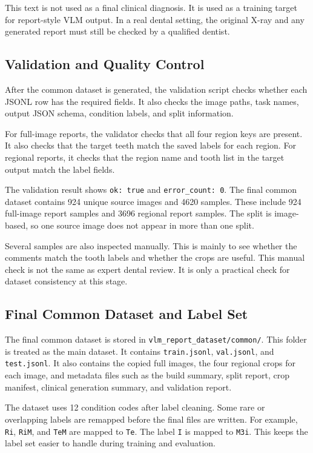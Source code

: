 \documentclass[a4paper,12pt]{report}
\begin{document}
This text is not used as a final clinical diagnosis. It is used as a training target for report-style VLM output. In a real dental setting, the original X-ray and any generated report must still be checked by a qualified dentist.


\subsection{Validation and Quality Control}

After the common dataset is generated, the validation script checks whether each JSONL row has the required fields. It also checks the image paths, task names, output JSON schema, condition labels, and split information.

For full-image reports, the validator checks that all four region keys are present. It also checks that the target teeth match the saved labels for each region. For regional reports, it checks that the region name and tooth list in the target output match the label fields.

The validation result shows \texttt{ok: true} and \texttt{error\_count: 0}. The final common dataset contains 924 unique source images and 4620 samples. These include 924 full-image report samples and 3696 regional report samples. The split is image-based, so one source image does not appear in more than one split.

Several samples are also inspected manually. This is mainly to see whether the comments match the tooth labels and whether the crops are useful. This manual check is not the same as expert dental review. It is only a practical check for dataset consistency at this stage.


\subsection{Final Common Dataset and Label Set}

The final common dataset is stored in \texttt{vlm\_report\_dataset/common/}. This folder is treated as the main dataset. It contains \texttt{train.jsonl}, \texttt{val.jsonl}, and \texttt{test.jsonl}. It also contains the copied full images, the four regional crops for each image, and metadata files such as the build summary, split report, crop manifest, clinical generation summary, and validation report.

The dataset uses 12 condition codes after label cleaning. Some rare or overlapping labels are remapped before the final files are written. For example, \texttt{Ri}, \texttt{RiM}, and \texttt{TeM} are mapped to \texttt{Te}. The label \texttt{I} is mapped to \texttt{M3i}. This keeps the label set easier to handle during training and evaluation.
\end{document}
